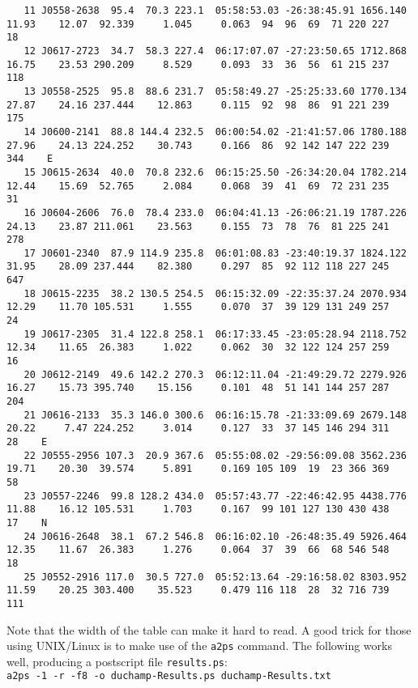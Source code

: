 {\begin{verbatim}
   11 J0558-2638  95.4  70.3 223.1  05:58:53.03 -26:38:45.91 1656.140    11.93    12.07  92.339     1.045     0.063  94  96  69  71 220 227    18     
   12 J0617-2723  34.7  58.3 227.4  06:17:07.07 -27:23:50.65 1712.868    16.75    23.53 290.209     8.529     0.093  33  36  56  61 215 237   118     
   13 J0558-2525  95.8  88.6 231.7  05:58:49.27 -25:25:33.60 1770.134    27.87    24.16 237.444    12.863     0.115  92  98  86  91 221 239   175     
   14 J0600-2141  88.8 144.4 232.5  06:00:54.02 -21:41:57.06 1780.188    27.96    24.13 224.252    30.743     0.166  86  92 142 147 222 239   344    E
   15 J0615-2634  40.0  70.8 232.6  06:15:25.50 -26:34:20.04 1782.214    12.44    15.69  52.765     2.084     0.068  39  41  69  72 231 235    31     
   16 J0604-2606  76.0  78.4 233.0  06:04:41.13 -26:06:21.19 1787.226    24.13    23.87 211.061    23.563     0.155  73  78  76  81 225 241   278     
   17 J0601-2340  87.9 114.9 235.8  06:01:08.83 -23:40:19.37 1824.122    31.95    28.09 237.444    82.380     0.297  85  92 112 118 227 245   647     
   18 J0615-2235  38.2 130.5 254.5  06:15:32.09 -22:35:37.24 2070.934    12.29    11.70 105.531     1.555     0.070  37  39 129 131 249 257    24     
   19 J0617-2305  31.4 122.8 258.1  06:17:33.45 -23:05:28.94 2118.752    12.34    11.65  26.383     1.022     0.062  30  32 122 124 257 259    16     
   20 J0612-2149  49.6 142.2 270.3  06:12:11.04 -21:49:29.72 2279.926    16.27    15.73 395.740    15.156     0.101  48  51 141 144 257 287   204     
   21 J0616-2133  35.3 146.0 300.6  06:16:15.78 -21:33:09.69 2679.148    20.22     7.47 224.252     3.014     0.127  33  37 145 146 294 311    28    E
   22 J0555-2956 107.3  20.9 367.6  05:55:08.02 -29:56:09.08 3562.236    19.71    20.30  39.574     5.891     0.169 105 109  19  23 366 369    58     
   23 J0557-2246  99.8 128.2 434.0  05:57:43.77 -22:46:42.95 4438.776    11.88    16.12 105.531     1.703     0.167  99 101 127 130 430 438    17    N
   24 J0616-2648  38.1  67.2 546.8  06:16:02.10 -26:48:35.49 5926.464    12.35    11.67  26.383     1.276     0.064  37  39  66  68 546 548    18     
   25 J0552-2916 117.0  30.5 727.0  05:52:13.64 -29:16:58.02 8303.952    11.59    20.25 303.400    35.523     0.479 116 118  28  32 716 739   111     
  \end{verbatim}
}
Note that the
width of the table can make it hard to read. A good trick for those
using UNIX/Linux is to make use of the \texttt{a2ps} command. The
following works well, producing a postscript file \texttt{results.ps}:
\\\verb|a2ps -1 -r -f8 -o duchamp-Results.ps duchamp-Results.txt|
